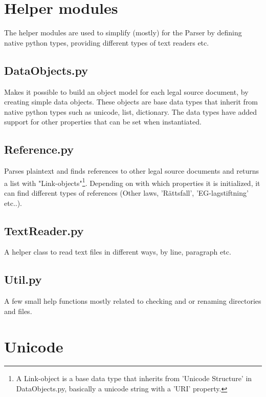 \section{Helper modules}

The helper modules are used to simplify (mostly) for the Parser by defining native python types, providing different types of text readers etc.  

\subsection{DataObjects.py}

Makes it possible to build an object model for each legal source document, by
creating simple data objects. These objects are base data types that inherit
from native python types such as unicode, list, dictionary. The data types have
added support for other properties that can be set when instantiated.

\subsection{Reference.py}

Parses plaintext and finds references to other legal source documents and
returns a list with "Link-objects"\footnote{A Link-object is a base data type
that inherits from 'Unicode Structure' in DataObjects.py, basically a unicode
string with a 'URI' property.}. Depending on with which properties it is
initialized, it can find different types of references (Other laws,
'Rättsfall', 'EG-lagstiftning' etc..).

\subsection{TextReader.py}
A helper class to read text files in different ways, by line, paragraph etc.  

\subsection{Util.py}

A few small help functions mostly related to checking and or renaming directories and files. 

\section{Unicode}

